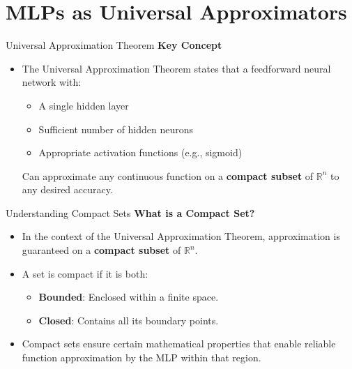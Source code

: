 \documentclass[serif, aspectratio=169]{beamer}
\begin{document}
\section{MLPs as Universal Approximators}

\begin{frame}{Universal Approximation Theorem}
	\textbf{Key Concept}
	\begin{itemize}
		\item The Universal Approximation Theorem states that a feedforward neural network with:
		\begin{itemize}
			\item A single hidden layer
			\item Sufficient number of hidden neurons
			\item Appropriate activation functions (e.g., sigmoid)
		\end{itemize}
		Can approximate any continuous function on a \textbf{compact subset} of $\mathbb{R}^n$ to any desired accuracy.
	\end{itemize}
	
\end{frame}

\begin{frame}{Understanding Compact Sets}
	\textbf{What is a Compact Set?}
	\begin{itemize}
		\item In the context of the Universal Approximation Theorem, approximation is guaranteed on a \textbf{compact subset} of $\mathbb{R}^n$.
		\item A set is compact if it is both:
		\begin{itemize}
			\item \textbf{Bounded}: Enclosed within a finite space.
			\item \textbf{Closed}: Contains all its boundary points.
		\end{itemize}
		\item Compact sets ensure certain mathematical properties that enable reliable function approximation by the MLP within that region.
	\end{itemize}
\end{frame}
\end{document}
